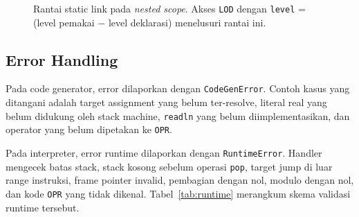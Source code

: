 \documentclass[11pt,a4paper]{article}
\begin{document}
\begin{figure}[H]
\centering
{}
\caption{Rantai static link pada \textit{nested scope}. Akses \texttt{LOD}
dengan \texttt{level} = (level pemakai $-$ level deklarasi) menelusuri rantai ini.}
\label{fig:staticlink}
\end{figure}

\subsection{Error Handling}

Pada code generator, error dilaporkan dengan \texttt{CodeGenError}. Contoh
kasus yang ditangani adalah target assignment yang belum ter-resolve, literal
real yang belum didukung oleh stack machine, \texttt{readln} yang belum
diimplementasikan, dan operator yang belum dipetakan ke \texttt{OPR}.

Pada interpreter, error runtime dilaporkan dengan \texttt{RuntimeError}. Handler
mengecek batas stack, stack kosong sebelum operasi \texttt{pop}, target jump di
luar range instruksi, frame pointer invalid, pembagian dengan nol, modulo dengan
nol, dan kode \texttt{OPR} yang tidak dikenal. Tabel~\ref{tab:runtime}
merangkum skema validasi runtime tersebut.
\end{document}
